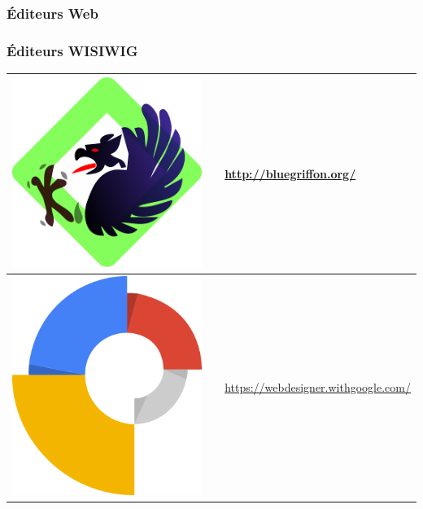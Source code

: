 \documentclass[xcolor=table]{beamer}
\begin{document}
\begin{frame}
\frametitle{Éditeurs Web}
\frametitle{Éditeurs WISIWIG}

\def\arraystretch{0}

\begin{tabular}{p{}cp{}}%
	
	\hline
	
	\includegraphics[height=.8cm]{..//img/Bweb08-dev-web/bluegriffon-logo.png} &
	& 
	\url{http://bluegriffon.org/}\\
	
	\hline
	
	\includegraphics[height=.8cm]{..//img/Bweb08-dev-web/google-web-designer-logo.png} &
	& 
	\url{https://webdesigner.withgoogle.com/} \\
	
	\hline
	
\end{tabular}

\end{frame}


\nocite{*}
%
% 

%	
%	
\end{document}
